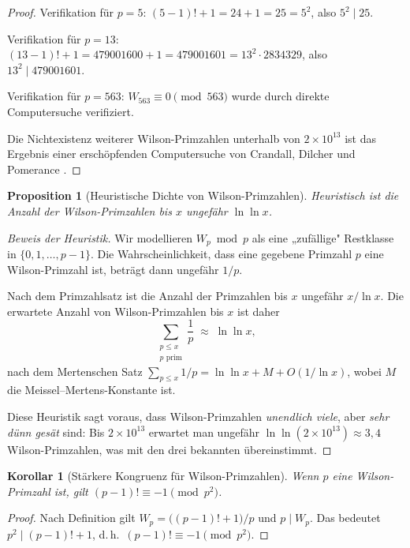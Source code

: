 \documentclass[12pt,a4paper]{amsart}
\newtheorem{korollar}[theorem]{Korollar}
\newtheorem{proposition}[theorem]{Proposition}
\theoremstyle{definition}
\begin{document}
\begin{proof}
  Verifikation für $p = 5$:
  $(5-1)! + 1 = 24 + 1 = 25 = 5^2$, also $5^2 \mid 25$. \checkmark

  Verifikation für $p = 13$:
  $(13-1)! + 1 = 479001600 + 1 = 479001601 = 13^2 \cdot 2834329$,
  also $13^2 \mid 479001601$. \checkmark

  Verifikation für $p = 563$:
  $W_{563} \equiv 0 \pmod{563}$ wurde durch direkte Computersuche verifiziert.

  Die Nichtexistenz weiterer Wilson-Primzahlen unterhalb von $2 \times 10^{13}$
  ist das Ergebnis einer erschöpfenden Computersuche von Crandall, Dilcher
  und Pomerance \cite{Crandall1997}.
\end{proof}

\begin{proposition}[Heuristische Dichte von Wilson-Primzahlen]\label{prop:heuristik}
  Heuristisch ist die Anzahl der Wilson-Primzahlen bis $x$ ungefähr $\ln \ln x$.
\end{proposition}

\begin{proof}[Beweis der Heuristik]
  Wir modellieren $W_p \bmod p$ als eine „zufällige" Restklasse in
  $\{0, 1, \ldots, p-1\}$. Die Wahrscheinlichkeit, dass eine gegebene
  Primzahl $p$ eine Wilson-Primzahl ist, beträgt dann ungefähr $1/p$.

  Nach dem Primzahlsatz ist die Anzahl der Primzahlen bis $x$ ungefähr
  $x/\ln x$. Die erwartete Anzahl von Wilson-Primzahlen bis $x$ ist daher
  \[
    \sum_{\substack{p \leq x \\ p \text{ prim}}} \frac{1}{p}
    \;\approx\; \ln \ln x,
  \]
  nach dem Mertenschen Satz $\sum_{p \leq x} 1/p = \ln \ln x + M + O(1/\ln x)$,
  wobei $M$ die Meissel--Mertens-Konstante ist.

  Diese Heuristik sagt voraus, dass Wilson-Primzahlen \emph{unendlich viele},
  aber \emph{sehr dünn gesät} sind: Bis $2 \times 10^{13}$ erwartet man
  ungefähr $\ln\ln(2 \times 10^{13}) \approx 3{,}4$ Wilson-Primzahlen,
  was mit den drei bekannten übereinstimmt.
\end{proof}

\begin{korollar}[Stärkere Kongruenz für Wilson-Primzahlen]\label{kor:staerker}
  Wenn $p$ eine Wilson-Primzahl ist, gilt $(p-1)! \equiv -1 \pmod{p^2}$.
\end{korollar}

\begin{proof}
  Nach Definition gilt $W_p = \bigl((p-1)!+1\bigr)/p$ und $p \mid W_p$.
  Das bedeutet $p^2 \mid (p-1)!+1$, d.\,h.\ $(p-1)! \equiv -1 \pmod{p^2}$.
\end{proof}
\end{document}
